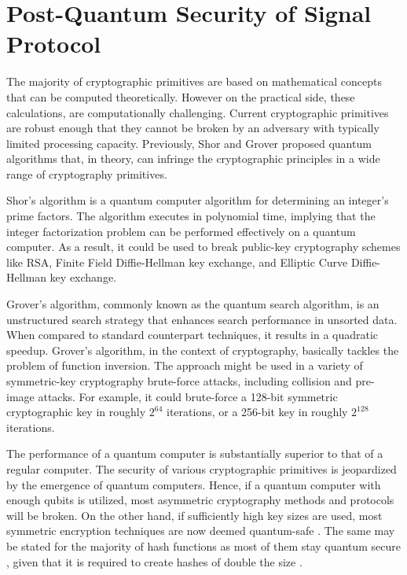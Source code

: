\section{Post-Quantum Security of Signal Protocol}
The majority of cryptographic primitives are based on mathematical concepts that can be computed theoretically. However on the practical side, these calculations, are computationally challenging.  Current cryptographic primitives are robust enough that they cannot be broken by an adversary with typically limited processing capacity. Previously, Shor \cite{shor94} and Grover \cite{gro96} proposed quantum algorithms that, in theory, can infringe the cryptographic principles in a wide range of cryptography primitives.
\par
Shor's algorithm is a quantum computer algorithm for determining an integer's prime factors. The algorithm executes in polynomial time, implying that the integer factorization problem can be performed effectively on a quantum computer. As a result, it could be used to break public-key cryptography schemes like RSA, Finite Field Diffie-Hellman key exchange, and Elliptic Curve Diffie-Hellman key exchange.
\par
Grover's algorithm, commonly known as the quantum search algorithm, is an unstructured search strategy that enhances search performance in unsorted data. When compared to standard counterpart techniques, it results in a quadratic speedup. Grover's algorithm, in the context of cryptography, basically tackles the problem of function inversion. The approach might be used in a variety of symmetric-key cryptography brute-force attacks, including collision and pre-image attacks. For example, it could brute-force a 128-bit symmetric cryptographic key in roughly $ 2^{64} $ iterations, or a 256-bit key in roughly $ 2^{128} $ iterations.
\par
The performance of a quantum computer is substantially superior to that of a regular computer. The security of various cryptographic primitives is jeopardized by the emergence of quantum computers. Hence, if a quantum computer with enough qubits is utilized, most asymmetric cryptography methods and protocols will be broken. On the other hand, if sufficiently high key sizes are used, most symmetric encryption techniques are now deemed quantum-safe \cite{essay77239}. The same may be stated for the majority of hash functions as most of them stay quantum secure \cite{ber09}, given that it is required to create hashes of double the size \cite{bra+98}.
\par

